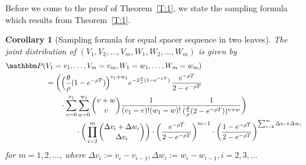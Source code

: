 \documentclass[preprint,authoryear]{elsarticle}
\newtheorem{corollary}[proposition]{Corollary}
\theoremstyle{definition}
\numberwithin{equation}{section}
\numberwithin{figure}{section}
\begin{document}
\noindent
Before we come to the proof of Theorem~\ref{T:1}, we state the
sampling formula which results from Theorem~\ref{T:1}.

\begin{corollary}[Sampling formula for equal spacer sequence in two
  leaves\label{cor:1}]
  The joint distribution of $(V_1, V_2,\dots,V_m, W_1, W_2, \dots, W_m)$ is given
  by
  \begin{align*}
    \mathbbm P( & V_1=v_1, \dots, V_m=v_m, W_1=w_1,\dots,W_m=w_m) 
    \\ & = 
         \bigg(\Big(\frac{\theta}{\rho}(1-e^{-\rho T})\Big)^{v_1+w_1} 
         e^{-2\frac{\theta}{\rho}(1-e^{-\rho T})} \, \frac{e^{-\rho T}}{2-e^{-\rho T}} 
    \\ & \qquad 
         \cdot\sum_{v=0}^{v_1} \sum_{w=0}^{w_1} \binom{v+w}{v} 
         \frac{1}{(v_1-v)!(w_1-w)!}\frac{1}{(\frac{\theta}{\rho}(2-e^{-\rho T}))^{v+w}}\bigg)
    \\ & \qquad \qquad \cdot 
         \bigg(\prod_{i=2}^m \binom{\Delta v_i + \Delta w_i}{\Delta v_i}\bigg)
         \cdot \bigg(\frac{e^{-\rho T}}{2-e^{-\rho T}} 
         \bigg)^{m-1}
         \cdot \bigg(\frac{1-e^{-\rho T}}{2 - e^{-\rho T}}
         \bigg)^{\sum_{i=2}^m \Delta v_i + \Delta w_i}
  \end{align*}
  for $m=1,2,\dots$, where
  $\Delta v_i := v_i - v_{i-1}, \Delta w_i := w_i - w_{i-1},
  i=2,3,\dots$
\end{corollary}
\end{document}
